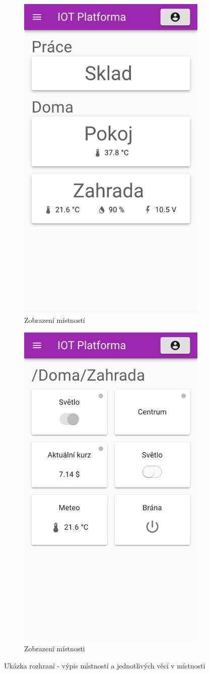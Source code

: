 \begin{figure}
    \centering
    \begin{subfigure}{.5\textwidth}
        \centering
        \includegraphics[width=.5\linewidth]{img/screens/buildings.png}
        \caption{Zobrazení místností}
        \label{fig:sub1}
    \end{subfigure}%
    \begin{subfigure}{.5\textwidth}
        \centering
        \includegraphics[width=.5\linewidth]{img/screens/room.png}
        \caption{Zobrazení místnosti}
        \label{fig:sub2}
    \end{subfigure}
    \caption{Ukázka rozhraní - výpis místností a jednotlivých věcí v místnosti}
    \label{fig:test}
\end{figure}

